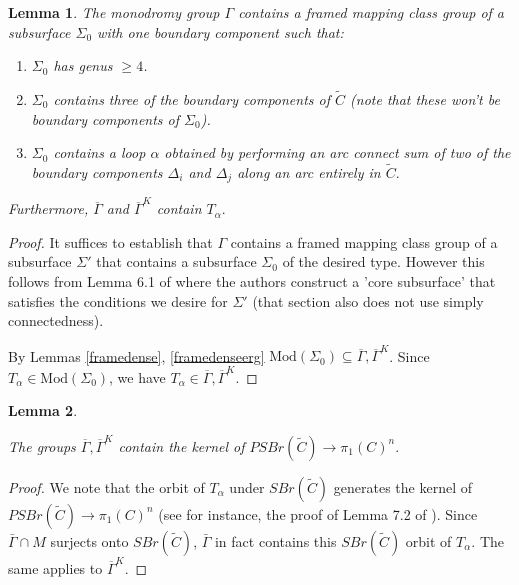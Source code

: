 \documentclass{article}
\newcommand{\Mod}{\textrm{Mod}}
\newtheorem{lemma}{Lemma}[theorem]
\begin{document}
\begin{lemma}
    The monodromy group $\Gamma$ contains a framed mapping class group of a subsurface $\Sigma_0$ with one boundary component such that:
    \begin{enumerate}
        \item $\Sigma_0$ has genus $\ge 4$.
        \item $\Sigma_0$ contains three of the boundary components of $\tilde C$ (note that these won't be boundary components of $\Sigma_0$).
        \item $\Sigma_0$ contains a  loop $\alpha$ obtained by performing an   arc connect sum of two of the boundary components $\Delta_i$ and $\Delta_j$ along an arc entirely in $\tilde C.$

    \end{enumerate}
  Furthermore, $\overline{\Gamma}$ and $\overline{\Gamma}^K$ contain $T_{\alpha}.$
\end{lemma}
\begin{proof}
    It suffices to establish that $\Gamma$ contains a framed mapping class group of a subsurface $\Sigma'$ that contains a subsurface $\Sigma_0$ of the desired type. However this follows from Lemma 6.1 of \cite{BS} where the authors construct a 'core subsurface' that satisfies the conditions we desire for $\Sigma'$ (that section also does not use simply connectedness).
    
    By Lemmas \ref{framedense}, \ref{framedenseerg}   $\Mod(\Sigma_0) \subseteq \overline{\Gamma} , \overline{\Gamma}^K$. Since $T_{\alpha} \in \Mod(\Sigma_0)$, we have $T_{\alpha} \in \overline{\Gamma}, \overline{\Gamma}^K.$

\end{proof}

\begin{lemma}\label{containsker}

    The groups $\overline{\Gamma}, \overline{\Gamma}^K$ contain the kernel of $PSBr(\tilde C) \to \pi_1(C)^n.$
\end{lemma}
\begin{proof}
    We note that the orbit of $T_{\alpha}$ under $SBr(\tilde C)$ generates the kernel of $PSBr(\tilde C) \to \pi_1(C)^n$ (see for instance, the proof of Lemma 7.2 of \cite{BS}).  Since $\bar\Gamma\cap M$ surjects onto $SBr(\tilde C)$, $\bar \Gamma$ in fact contains this $SBr(\tilde C)$ orbit of $T_{\alpha}$. The same applies to $\overline{\Gamma}^K.$
\end{proof}
\end{document}
